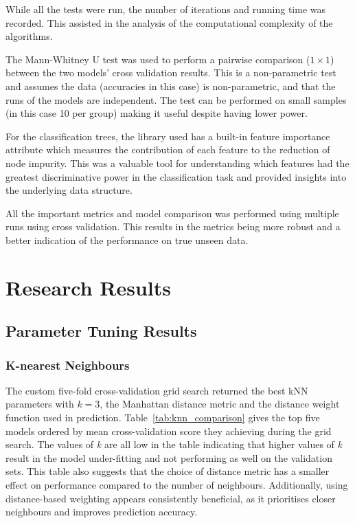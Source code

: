 \documentclass[10pt, conference]{IEEEtran}
\begin{document}
While all the tests were run, the number of iterations and running time was recorded. This assisted in the analysis of the computational complexity of the algorithms.

The Mann-Whitney U test \cite{mann1947test} was used to perform a pairwise comparison ($1 \times 1$) between the two models' cross validation results.  This is a non-parametric test and assumes the data (accuracies in this case) is non-parametric, and that the runs of the models are independent. The test can be performed on small samples (in this case 10 per group) making it useful despite having lower power.

For the classification trees, the library used has a built-in feature importance attribute which measures the contribution of each feature to the reduction of node impurity. This was a valuable tool for understanding which features had the greatest discriminative power in the classification task and provided insights into the underlying data structure.

All the important metrics and model comparison was performed using multiple runs using cross validation. This results in the metrics being more robust and a better indication of the performance on true unseen data.

\section{Research Results}
\subsection{Parameter Tuning Results}
\subsubsection{K-nearest Neighbours}
The custom five-fold cross-validation grid search returned the best kNN parameters with $k=3$, the Manhattan distance metric and the distance weight function used in prediction. Table~\ref{tab:knn_comparison} gives the top five models ordered by mean cross-validation score they achieving during the grid search. The values of \textit{k} are all low in the table indicating that higher values of \textit{k} result in the model under-fitting and not performing as well on the validation sets. This table also suggests that the choice of distance metric has a smaller effect on performance compared to the number of neighbours. Additionally, using distance-based weighting appears consistently beneficial, as it prioritises closer neighbours and improves prediction accuracy.
\end{document}

